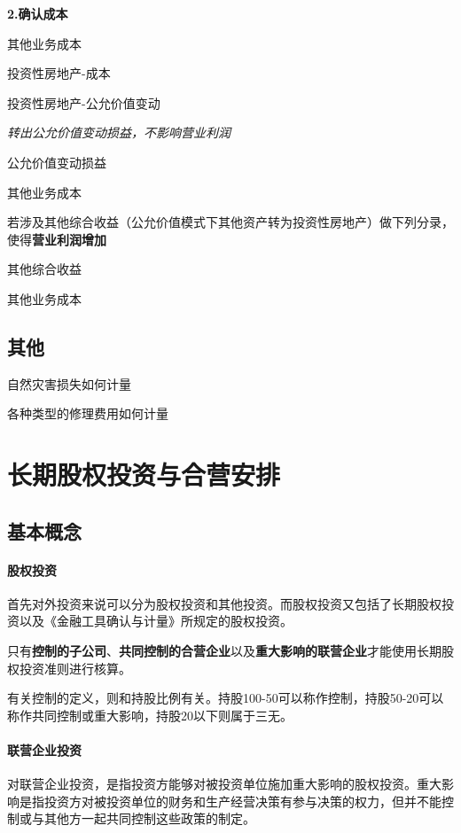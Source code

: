 \documentclass[UTF8,12pt]{ctexart}
\newenvironment{Dr}{%
	\begin{list}{}%
		{
			\setlength{\leftmargin}{2em}
			\setlength{\labelwidth}{2em}
			\setlength{\labelsep}{0pt}
			\setlength{\itemindent}{0pt}
			\setlength{\listparindent}{0pt}
			\setlength{\parsep}{0pt}
			\setlength{\topsep}{0pt}
		}
		\item[\textbf{借：}]
	}{%
	\end{list}
}
\newenvironment{Cr}{%
	\begin{list}{}%
		{
			\setlength{\leftmargin}{2em}
			\setlength{\labelwidth}{2em}
			\setlength{\labelsep}{0pt}
			\setlength{\itemindent}{0pt}
			\setlength{\listparindent}{0pt}
			\setlength{\parsep}{0pt}
			\setlength{\topsep}{0pt}
		}
		\item[\textbf{贷：}]
	}{%
	\end{list}
}
\numberwithin{equation}{section} %
\numberwithin{figure}{section}
\numberwithin{table}{section}
\begin{document}
	
	\textbf{2.确认成本}
	
	\begin{Dr}
		其他业务成本
	\end{Dr}
	\begin{Cr}
		投资性房地产-成本
		
		投资性房地产-公允价值变动
	\end{Cr}
	
	
	\textit{转出公允价值变动损益，不影响营业利润}
	
	\begin{Dr}
		公允价值变动损益
	\end{Dr}
	\begin{Cr}
		其他业务成本
	\end{Cr}
	
	若涉及其他综合收益（公允价值模式下其他资产转为投资性房地产）做下列分录，使得\textbf{营业利润增加}
	
	\begin{Dr}
		其他综合收益
	\end{Dr}
	\begin{Cr}
		其他业务成本
	\end{Cr}

	\subsection{其他}
	自然灾害损失如何计量
	
	各种类型的修理费用如何计量
	
	\newpage
	\section{长期股权投资与合营安排}
	\subsection{基本概念}
	\paragraph{股权投资}
	首先对外投资来说可以分为股权投资和其他投资。而股权投资又包括了长期股权投资以及《金融工具确认与计量》所规定的股权投资。
	
	只有\textbf{控制的子公司}、\textbf{共同控制的合营企业}以及\textbf{重大影响的联营企业}才能使用长期股权投资准则进行核算。
	
	有关控制的定义，则和持股比例有关。持股100-50可以称作控制，持股50-20可以称作共同控制或重大影响，持股20以下则属于三无。
	
	\paragraph{联营企业投资}
	对联营企业投资，是指投资方能够对被投资单位施加重大影响的股权投资。重大影响是指投资方对被投资单位的财务和生产经营决策有参与决策的权力，但并不能控制或与其他方一起共同控制这些政策的制定。
	
\end{document}
